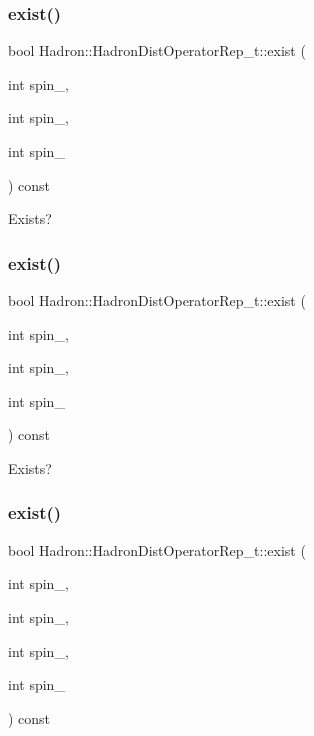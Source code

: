 \subsubsection{\texorpdfstring{exist()}{exist()}\hspace{0.1cm}{\footnotesize\ttfamily [3/8]}}
{\footnotesize\ttfamily bool Hadron\+::\+Hadron\+Dist\+Operator\+Rep\+\_\+t\+::exist (\begin{DoxyParamCaption}\item[{int}]{spin\+\_,  }\item[{int}]{spin\+\_,  }\item[{int}]{spin\+\_ }\end{DoxyParamCaption}) const}



Exists? 

\mbox{\label{classHadron_1_1HadronDistOperatorRep__t_a1ae795fcc4b7bc12cadef8f26884cee3}} 
\subsubsection{\texorpdfstring{exist()}{exist()}\hspace{0.1cm}{\footnotesize\ttfamily [4/8]}}
{\footnotesize\ttfamily bool Hadron\+::\+Hadron\+Dist\+Operator\+Rep\+\_\+t\+::exist (\begin{DoxyParamCaption}\item[{int}]{spin\+\_,  }\item[{int}]{spin\+\_,  }\item[{int}]{spin\+\_ }\end{DoxyParamCaption}) const}



Exists? 

\mbox{\label{classHadron_1_1HadronDistOperatorRep__t_affb8fd51f21253d65fcc02b6517fd593}} 
\subsubsection{\texorpdfstring{exist()}{exist()}\hspace{0.1cm}{\footnotesize\ttfamily [5/8]}}
{\footnotesize\ttfamily bool Hadron\+::\+Hadron\+Dist\+Operator\+Rep\+\_\+t\+::exist (\begin{DoxyParamCaption}\item[{int}]{spin\+\_,  }\item[{int}]{spin\+\_,  }\item[{int}]{spin\+\_,  }\item[{int}]{spin\+\_ }\end{DoxyParamCaption}) const}



